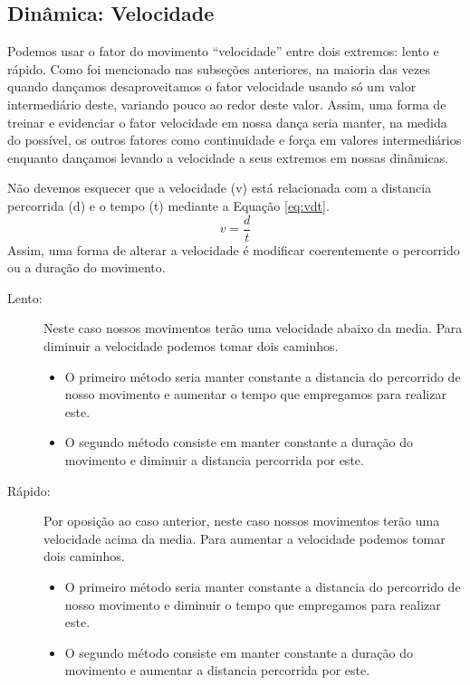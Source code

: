 \subsection{Dinâmica: Velocidade }
\label{subsec:dinamica:velocidade}


Podemos usar o fator do movimento ``velocidade'' entre dois extremos: lento e  rápido.
Como foi mencionado nas subseções anteriores, 
na maioria das vezes 
quando dançamos desaproveitamos o fator velocidade usando só um valor intermediário deste,
variando pouco ao redor deste valor.
Assim, uma forma de treinar e evidenciar o fator velocidade em nossa dança seria manter, na medida do possível,
os outros fatores como continuidade e força em valores intermediários 
enquanto dançamos levando a velocidade a seus extremos em nossas dinâmicas.

Não devemos esquecer que a velocidade (v) está relacionada com a distancia percorrida (d) e o tempo (t) 
mediante a Equação \ref{eq:vdt}.
\begin{equation}
\label{eq:vdt}
v=\frac{d}{t}
\end{equation}
Assim, 
uma forma de alterar a velocidade é modificar coerentemente o percorrido ou a duração do movimento.


\begin{description}
\item[Lento:] Neste caso nossos movimentos terão uma velocidade abaixo da media.
Para diminuir a velocidade podemos tomar dois caminhos.
\begin{itemize}
\item O primeiro método seria manter constante a distancia do percorrido de nosso movimento 
e aumentar o tempo que empregamos para realizar este.
\item O segundo método consiste em manter constante a duração do movimento e diminuir a distancia percorrida por este. 
\end{itemize}
\item[Rápido:] Por oposição ao caso anterior, 
neste caso nossos movimentos terão uma velocidade acima da media.
Para aumentar a velocidade podemos tomar dois caminhos.
\begin{itemize}
\item O primeiro método seria manter constante a distancia do percorrido de nosso movimento 
e diminuir o tempo que empregamos para realizar este.
\item O segundo método consiste em manter constante a duração do movimento e aumentar a distancia percorrida por este. 
\end{itemize}
\end{description}


